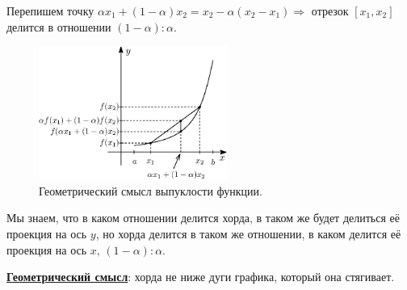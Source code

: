 \documentclass[12pt]{article}
\theoremstyle{definition}
\begin{document}
Перепишем точку $\alpha x_1 + (1-\alpha) x_2 = x_2 - \alpha(x_2 - x_1) \Rightarrow$ отрезок $[x_1,x_2]$ делится в отношении $(1-\alpha) : \alpha$. 
\begin{figure}[H]
	\centering
	\includegraphics[width=0.55\textwidth]{27_5.eps}
	\caption{Геометрический смысл выпуклости функции.}
	\label{27_5}
\end{figure}
Мы знаем, что в каком отношении делится хорда, в таком же будет делиться её проекция на ось $y$, но хорда делится в таком же отношении, в каком делится её проекция на ось $x, \, (1-\alpha) : \alpha$.

\uline{\textbf{Геометрический смысл}}: хорда не ниже дуги графика, который она стягивает.
 
\end{document}

